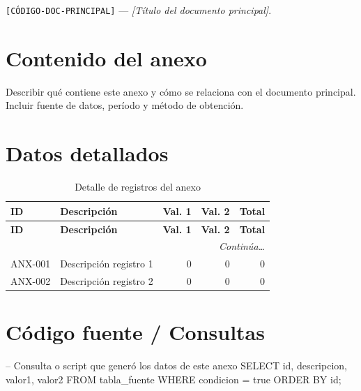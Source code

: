 \documentclass{../base/canon}
\begin{document}
 \texttt{[CÓDIGO-DOC-PRINCIPAL]} —
\textit{[Título del documento principal]}.

\section{Contenido del anexo}

\begin{ParrafoMetodologico}
Describir qué contiene este anexo y cómo se relaciona con el documento principal.
Incluir fuente de datos, período y método de obtención.
\end{ParrafoMetodologico}

\section{Datos detallados}

\begin{center}
\begin{longtable}{@{} l l r r r @{}}
  \caption{Detalle de registros del anexo} \\
  \toprule
  \textbf{ID} & \textbf{Descripción} & \textbf{Val. 1} & \textbf{Val. 2} & \textbf{Total} \\
  \midrule
  \endfirsthead
  \toprule
  \textbf{ID} & \textbf{Descripción} & \textbf{Val. 1} & \textbf{Val. 2} & \textbf{Total} \\
  \midrule
  \endhead
  \midrule
  \multicolumn{5}{r}{\small\itshape Continúa\ldots} \\
  \endfoot
  \bottomrule
  \endlastfoot
  ANX-001 & Descripción registro 1 & 0 & 0 & 0 \\
  ANX-002 & Descripción registro 2 & 0 & 0 & 0 \\
\end{longtable}
\end{center}

\section{Código fuente / Consultas}

\begin{CodeBlock}
-- Consulta o script que generó los datos de este anexo
SELECT id, descripcion, valor1, valor2
FROM tabla_fuente
WHERE condicion = true
ORDER BY id;
\end{CodeBlock}
\end{document}

